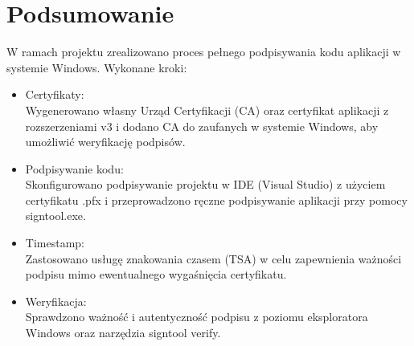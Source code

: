 \documentclass{article}
\begin{document}
\section*{Podsumowanie}
 W ramach projektu zrealizowano proces pełnego podpisywania kodu aplikacji w systemie Windows. Wykonane kroki:
\begin{itemize}
    \item Certyfikaty:\\
Wygenerowano własny Urząd Certyfikacji (CA) oraz certyfikat aplikacji z rozszerzeniami v3 i dodano CA do zaufanych  w systemie Windows, aby umożliwić weryfikację podpisów.
    \item Podpisywanie kodu:\\
Skonfigurowano podpisywanie projektu w IDE (Visual Studio) z użyciem certyfikatu .pfx i przeprowadzono ręczne podpisywanie aplikacji przy pomocy signtool.exe.
    \item Timestamp:\\
Zastosowano usługę znakowania czasem (TSA) w celu zapewnienia ważności podpisu mimo ewentualnego wygaśnięcia certyfikatu.
    \item Weryfikacja:\\
Sprawdzono ważność i autentyczność podpisu z poziomu eksploratora Windows oraz narzędzia signtool verify.
\end{itemize}
\end{document}

